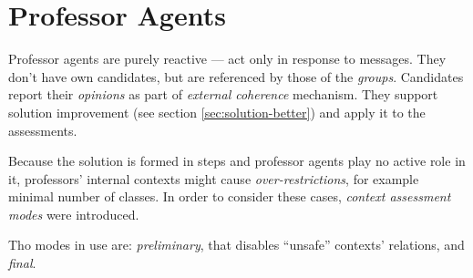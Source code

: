 \documentclass[../../ThesisDoc]{subfiles}
\begin{document}
\providecommand{\rootdir}{../..}


\section{Professor Agents}
Professor agents are purely reactive --- act only in response to messages.
They don't have own candidates, but are referenced by those of the \emph{groups}.
Candidates report their \emph{opinions} as part of \emph{external coherence}
mechanism. They support solution improvement (see section \ref{sec:solution-better})
and apply it to the assessments.

Because the solution is formed in steps and professor agents play no active role
in it, professors' internal contexts might cause \emph{over-restrictions}, for
example minimal number of classes. In order to consider these cases,
\emph{context assessment modes} were introduced.

Tho modes in use are: \emph{preliminary}, that disables ``unsafe'' contexts' relations,
and \emph{final}.
\end{document}
